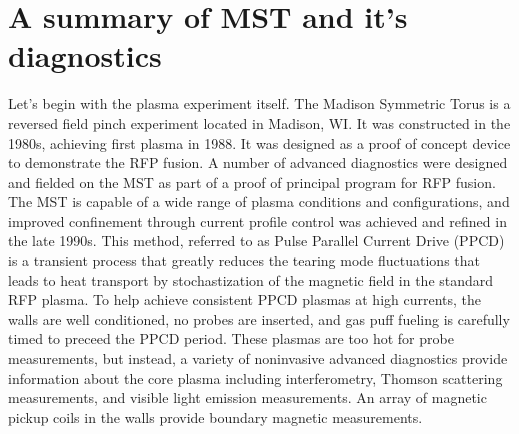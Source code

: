 \section{A summary of MST and it's diagnostics}\label{sec:MST}
Let's begin with the plasma experiment itself. The Madison Symmetric Torus is a reversed field pinch experiment located in Madison, WI. It was constructed in the 1980s, achieving first plasma in 1988\cite{Dexter1991}. It was designed as a proof of concept device to demonstrate the RFP fusion\cite{Najmabadi1999}. 
A number of advanced diagnostics were designed and fielded on the MST as part of a proof of principal program for RFP fusion. %
The MST is capable of a wide range of plasma conditions and configurations, and improved confinement through current profile control was achieved and refined in the late 1990s\cite{Sarff1995TransportPinch, Chapman2002HighPinch}. This method, referred to as Pulse Parallel Current Drive (PPCD) is a transient process that greatly reduces the tearing mode fluctuations that %
leads to heat transport by stochastization of the magnetic field in
the standard RFP plasma.
To help achieve consistent PPCD plasmas at high currents, the walls are well conditioned, no probes are inserted, and gas puff fueling is carefully timed to preceed the PPCD period. These plasmas are too hot for probe measurements, but instead, a variety of noninvasive advanced diagnostics provide information about the core plasma including interferometry, Thomson scattering measurements, and visible light emission measurements. An array of magnetic pickup coils in the walls provide boundary magnetic measurements. 

